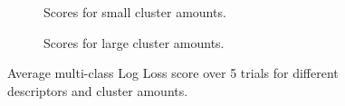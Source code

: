 \begin{figure}[ht]
    \centering
    \begin{subfigure}{.45\textwidth}
        \centering
        \captionsetup{width=0.9\linewidth}
        \captionsetup{justification=centering}
        \caption{Scores for small cluster amounts.}
    \end{subfigure}
    \hspace{1cm}
    \begin{subfigure}{.45\textwidth}
        \centering
        \captionsetup{width=0.9\linewidth}
        \captionsetup{justification=centering}
        \caption{Scores for large cluster amounts.}
    \end{subfigure}
    \captionsetup{width=0.8\linewidth}
    \captionsetup{justification=centering}
    \caption{Average multi-class Log Loss score over 5 trials for different descriptors and cluster amounts.}
    \label{fig:2-input}
\end{figure}


